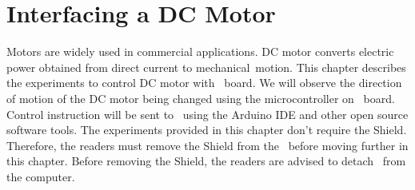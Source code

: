 \chapter{Interfacing a DC Motor}
\thispagestyle{empty}
\label{dcmotor}
\newcommand{\LocDCMfig}{\Origin/user-code/dcmotor/figures}
\newcommand{\LocDCMscicode}{\Origin/user-code/dcmotor/scilab}
\newcommand{\LocDCMscibrief}[1]{{\tt \seqsplit{
        Origin/user-code/dcmotor/scilab/#1}},
  see \fnrefp{fn:file-loc}}
\newcommand{\LocDCMardcode}{\Origin/user-code/dcmotor/arduino}
\newcommand{\LocDCMardbrief}[1]{{\tt \seqsplit{
        Origin/user-code/dcmotor/arduino/#1}},
  see \fnrefp{fn:file-loc}}

\newcommand{\LocDCMpycode}{\Origin/user-code/dcmotor/python}
\newcommand{\LocDCMpybrief}[1]{{\tt \seqsplit{
        Origin/user-code/dcmotor/python/#1}},
  see \fnrefp{fn:file-loc}}

\newcommand{\LocDCMjuliacode}{\Origin/user-code/dcmotor/julia}
\newcommand{\LocDCMjuliabrief}[1]{{\tt \seqsplit{
        Origin/user-code/dcmotor/julia/#1}},
  see \fnrefp{fn:file-loc}}

\newcommand{\LocDCMOpenModelicacode}{\Origin/user-code/dcmotor/OpenModelica}  %
\newcommand{\LocDCMOpenModelicabrief}[1]{{\tt \seqsplit{%
        Origin/user-code/led/OpenModelica/#1}}, see \fnrefp{fn:file-loc}} %


Motors are widely used in commercial applications. 
DC motor converts electric power obtained from direct current to 
mechanical motion. This chapter describes the experiments to 
control DC motor with \arduino\ board. We will observe the 
direction of motion of the DC motor being changed 
using the microcontroller on \arduino\ board. 
Control instruction will be sent to \arduino\ using the Arduino IDE and other open source software tools. 
The experiments provided in this chapter don't require the Shield. 
Therefore, the readers must remove the Shield from the \arduino\ before 
moving further in this chapter. Before removing the Shield, 
the readers are advised to detach \arduino\ from the computer. 

